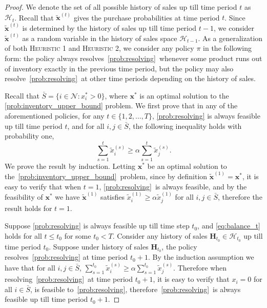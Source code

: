 \documentclass[10pt,a4paper]{amsart}
\begin{document}
\begin{proof}
We denote the set of all possible history of sales up till time period $t$ as $\mathcal{H}_t$. Recall that $\tilde{\bm{x}}^{(t)}$ gives the purchase probabilities at time period $t$. Since $\tilde{\bm{x}}^{(t)}$ is determined by the history of sales up till time period $t-1$, we consider $\tilde{\bm{x}}^{(t)}$ as a random variable in the history of sales space $\mathcal{H}_{t-1}$. As a generalization of both \textsc{Heuristic 1} and \textsc{Heuristic 2}, we consider any policy $\pi$ in the following form: the policy always resolves~\ref{prob:resolving}~whenever some product runs out of inventory exactly in the previous time period, but the policy may also resolve~\ref{prob:resolving}~at other time periods depending on the history of sales.

Recall that $\bar{S}=\{i\in\mathcal{N}:x_i^*>0\}$, where $\bm{x}^*$ is an optimal solution to the \ref{prob:inventory_upper_bound} problem. We first prove that in any of the aforementioned policies, for any $t\in\{1,2,\dots,T\}$, \ref{prob:resolving} is always feasible up till time period $t$, and for all $i,j\in\bar{S}$, the following inequality holds with probability one,
\begin{equation}\label{eq:balance_t}
\sum_{s=1}^t \tilde{x}_i^{(s)}\geq \alpha\sum_{s=1}^t\tilde{x}_j^{(s)}.
\end{equation}
We prove the result by induction. Letting $\bm{x}^*$ be an optimal solution to the~\ref{prob:inventory_upper_bound}~problem, since by definition $\tilde{\bm{x}}^{(1)}=\bm{x}^*$, it is easy to verify that when $t=1$, \ref{prob:resolving}~is always feasible, and by the feasibility of $\bm{x}^*$ we have $\tilde{\bm{x}}^{(1)}$ satisfies $\tilde{x}_i^{(1)}\geq \alpha\tilde{x}_j^{(1)}$ for all $i,j\in\bar{S}$, therefore the result holds for $t=1$. 

Suppose \ref{prob:resolving} is always feasible up till time step $t_0$, and \eqref{eq:balance_t} holds for all $t\leq t_0$ for some $t_0<T$. Consider any history of sales $\bm{H}_{t_0}\in\mathcal{H}_{t_0}$ up till time period $t_0$. Suppose under history of sales $\bm{H}_{t_0}$, the policy resolves~\ref{prob:resolving} at time period $t_0+1$. By the induction assumption we have that for all $i,j\in\bar{S}$, $\sum_{s=1}^{t_0}\tilde{x}_i^{(s)}\geq \alpha\sum_{s=1}^{t_0}\tilde{x}_j^{(s)}$. Therefore when resolving~\ref{prob:resolving}~at time period $t_0+1$, it is easy to verify that $x_i=0$ for all $i\in\bar{S}$, is feasible to~\ref{prob:resolving}, therefore~\ref{prob:resolving}~is always feasible up till time period $t_0+1$.


\end{proof}
\end{document}
